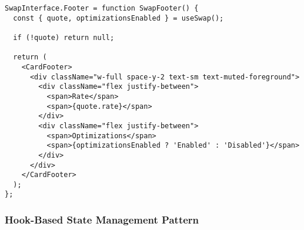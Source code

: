 \documentclass[11pt,a4paper]{article}
\begin{document}
\begin{lstlisting}[style=typescript, caption=SwapInterface Compound Component]
SwapInterface.Footer = function SwapFooter() {
  const { quote, optimizationsEnabled } = useSwap();
  
  if (!quote) return null;
  
  return (
    <CardFooter>
      <div className="w-full space-y-2 text-sm text-muted-foreground">
        <div className="flex justify-between">
          <span>Rate</span>
          <span>{quote.rate}</span>
        </div>
        <div className="flex justify-between">
          <span>Optimizations</span>
          <span>{optimizationsEnabled ? 'Enabled' : 'Disabled'}</span>
        </div>
      </div>
    </CardFooter>
  );
};
\end{lstlisting}

\subsubsection{Hook-Based State Management Pattern}
\end{document}
